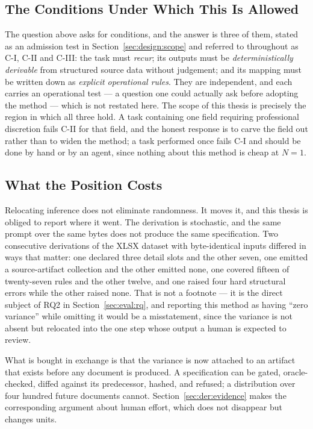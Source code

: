 \subsection{The Conditions Under Which This Is Allowed}
\label{sec:intro:position:conditions}

The question above asks for conditions, and the answer is three of them, stated as an
admission test in Section~\ref{sec:design:scope} and referred to throughout as C-I, C-II and
C-III: the task must \emph{recur}; its outputs must be \emph{deterministically derivable}
from structured source data without judgement; and its mapping must be written down as
\emph{explicit operational rules}. They are independent, and each carries an operational
test --- a question one could actually ask before adopting the method --- which is not
restated here. The scope of this thesis is precisely the region in which all three hold. A
task containing one field requiring professional discretion fails C-II for that field, and
the honest response is to carve the field out rather than to widen the method; a task
performed once fails C-I and should be done by hand or by an agent, since nothing about this
method is cheap at $N=1$.

\subsection{What the Position Costs}
\label{sec:intro:position:cost}

Relocating inference does not eliminate randomness. It moves it, and this thesis is obliged
to report where it went. The derivation is stochastic, and the same prompt over the same
bytes does not produce the same specification. Two consecutive derivations of the XLSX
dataset with byte-identical inputs differed in ways that matter: one declared three detail
slots and the other seven, one emitted a source-artifact collection and the other emitted
none, one covered fifteen of twenty-seven rules and the other twelve, and one raised four
hard structural errors while the other raised none. That is not a footnote --- it is the
direct subject of RQ2 in Section~\ref{sec:eval:rq}, and reporting this method as having
``zero variance'' while omitting it would be a misstatement, since the variance is not absent
but relocated into the one step whose output a human is expected to review.

What is bought in exchange is that the variance is now attached to an artifact that exists
before any document is produced. A specification can be gated, oracle-checked, diffed against
its predecessor, hashed, and refused; a distribution over four hundred future documents
cannot. Section~\ref{sec:der:evidence} makes the corresponding argument about human effort,
which does not disappear but changes units.

